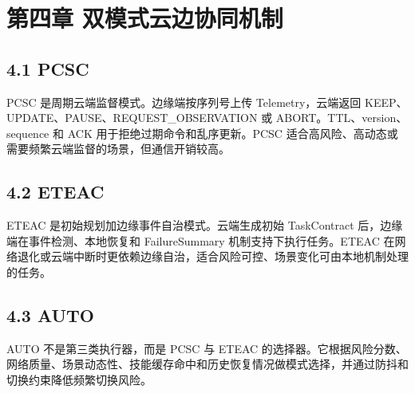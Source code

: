 \chapter{第四章 双模式云边协同机制}

\section{4.1 PCSC}

PCSC 是周期云端监督模式。边缘端按序列号上传 Telemetry，云端返回 KEEP、UPDATE、PAUSE、REQUEST\_OBSERVATION 或 ABORT。TTL、version、sequence 和 ACK 用于拒绝过期命令和乱序更新。PCSC 适合高风险、高动态或需要频繁云端监督的场景，但通信开销较高。\par

\section{4.2 ETEAC}

ETEAC 是初始规划加边缘事件自治模式。云端生成初始 TaskContract 后，边缘端在事件检测、本地恢复和 FailureSummary 机制支持下执行任务。ETEAC 在网络退化或云端中断时更依赖边缘自治，适合风险可控、场景变化可由本地机制处理的任务。\par

\section{4.3 AUTO}

AUTO 不是第三类执行器，而是 PCSC 与 ETEAC 的选择器。它根据风险分数、网络质量、场景动态性、技能缓存命中和历史恢复情况做模式选择，并通过防抖和切换约束降低频繁切换风险。\par
